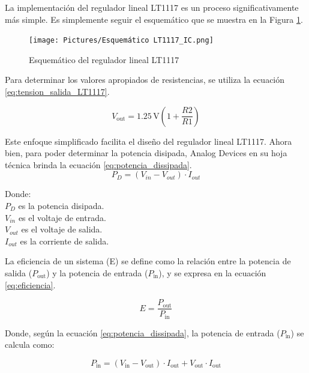 La implementación del regulador lineal LT1117 es un proceso significativamente más simple. Es simplemente seguir el esquemático que se muestra en la Figura \ref{fig:Esquematico_LT1117_IC}.

\begin{figure}[h]
\centering
\texttt{[image: Pictures/Esquemático LT1117\_IC.png]}
\caption{Esquemático del regulador lineal LT1117}
\label{fig:Esquematico_LT1117_IC}
\end{figure}


Para determinar los valores apropiados de resistencias, se utiliza la ecuación \ref{eq:tension_salida_LT1117}.

\begin{equation}\label{eq:tension_salida_LT1117}
V_{\text{out}} = 1.25 \, \text{V} \left(1 + \frac{R2}{R1}\right)
\end{equation}

Este enfoque simplificado facilita el diseño del regulador lineal LT1117. Ahora bien, para poder determinar la potencia disipada, Analog Devices en su hoja técnica brinda la ecuación \ref{eq:potencia_dissipada}.
\newpage
\begin{equation}
P_D = (V_{in} - V_{out}) \cdot I_{out}
\label{eq:potencia_dissipada}
\end{equation}


Donde:\\
$P_D$ es la potencia disipada.\\
$V_{in}$ es el voltaje de entrada.\\
$V_{out}$ es el voltaje de salida.\\
$I_{out}$ es la corriente de salida.

La eficiencia de un sistema (E) se define como la relación entre la potencia de salida ($P_{\text{out}}$) y la potencia de entrada ($P_{\text{in}}$), y se expresa en la ecuación \ref{eq:eficiencia}.

\begin{equation}
E = \frac{P_{\text{out}}}{P_{\text{in}}}
\label{eq:eficiencia}
\end{equation}

Donde, según la ecuación \ref{eq:potencia_dissipada}, la potencia de entrada ($P_{\text{in}}$) se calcula como:

\begin{equation}
P_{\text{in}} = (V_{\text{in}} - V_{\text{out}}) \cdot I_{\text{out}} + V_{\text{out}} \cdot I_{\text{out}}
\label{eq:eficiencia2}
\end{equation}

